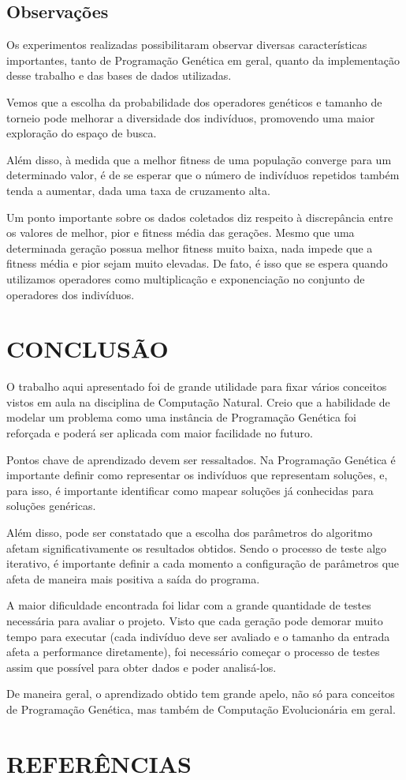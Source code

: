 \documentclass[12pt]{article}
\begin{document}
\subsection{Observações}

Os experimentos realizadas possibilitaram observar diversas características importantes, tanto
de Programação Genética em geral, quanto da implementação desse trabalho e das bases de dados
utilizadas.

Vemos que a escolha da probabilidade dos operadores genéticos e tamanho de torneio pode melhorar
a diversidade dos indivíduos, promovendo uma maior exploração do espaço de busca.

Além disso, à medida que a melhor fitness de uma população converge para um determinado valor,
é de se esperar que o número de indivíduos repetidos também tenda a aumentar, dada uma taxa 
de cruzamento alta.

Um ponto importante sobre os dados coletados diz respeito à discrepância entre os valores de 
melhor, pior e fitness média das gerações. Mesmo que uma determinada geração possua melhor fitness
muito baixa, nada impede que a fitness média e pior sejam muito elevadas. De fato, é isso que se
espera quando utilizamos operadores como multiplicação e exponenciação no conjunto de operadores
dos indivíduos.

\section{CONCLUSÃO}

O trabalho aqui apresentado foi de grande utilidade para fixar vários conceitos vistos em aula
na disciplina de Computação Natural. Creio que a habilidade de modelar um problema como uma
instância de Programação Genética foi reforçada e poderá ser aplicada com maior facilidade
no futuro.

Pontos chave de aprendizado devem ser ressaltados. Na Programação Genética é importante
definir como representar os indivíduos que representam soluções, e, para isso, é importante
identificar como mapear soluções já conhecidas para soluções genéricas.

Além disso, pode ser constatado que a escolha dos parâmetros do algoritmo afetam significativamente
os resultados obtidos. Sendo o processo de teste algo iterativo, é importante definir a cada
momento a configuração de parâmetros que afeta de maneira mais positiva a saída do programa.

A maior dificuldade encontrada foi lidar com a grande quantidade de testes necessária para
avaliar o projeto. Visto que cada geração pode demorar muito tempo para executar (cada indivíduo
deve ser avaliado e o tamanho da entrada afeta a performance diretamente), foi necessário começar
o processo de testes assim que possível para obter dados e poder analisá-los.

De maneira geral, o aprendizado obtido tem grande apelo, não só para conceitos de Programação Genética,
mas também de Computação Evolucionária em geral.

\section{REFERÊNCIAS}



\end{document}

